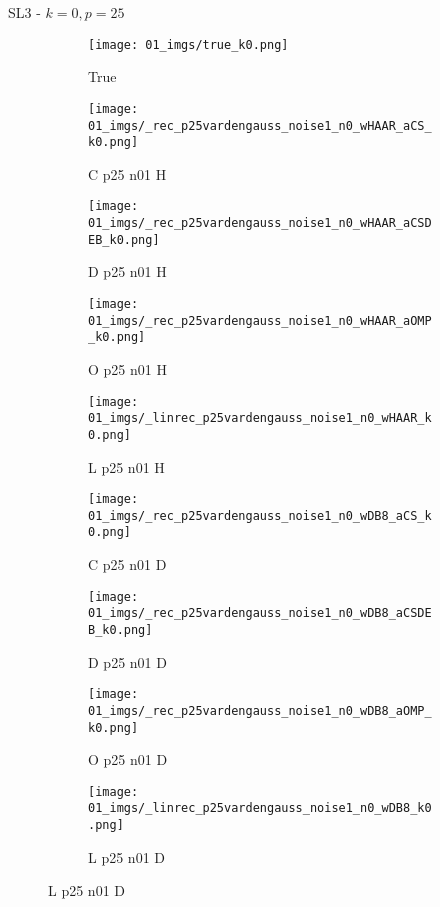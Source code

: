 \begin{frame}{SL3 - $k=0,p=25$}{}
\begin{figure}
\begin{subfigure}{0.1\textwidth}
\texttt{[image: 01\_imgs/true\_k0.png]}
\caption*{\Tiny True}
\end{subfigure}
\begin{subfigure}{0.1\textwidth}
\texttt{[image: 01\_imgs/\_rec\_p25vardengauss\_noise1\_n0\_wHAAR\_aCS\_k0.png]}
\caption*{\Tiny C p25 n01 H}
\end{subfigure}
\begin{subfigure}{0.1\textwidth}
\texttt{[image: 01\_imgs/\_rec\_p25vardengauss\_noise1\_n0\_wHAAR\_aCSDEB\_k0.png]}
\caption*{\Tiny D p25 n01 H}
\end{subfigure}
\begin{subfigure}{0.1\textwidth}
\texttt{[image: 01\_imgs/\_rec\_p25vardengauss\_noise1\_n0\_wHAAR\_aOMP\_k0.png]}
\caption*{\Tiny O p25 n01 H}
\end{subfigure}
\begin{subfigure}{0.1\textwidth}
\texttt{[image: 01\_imgs/\_linrec\_p25vardengauss\_noise1\_n0\_wHAAR\_k0.png]}
\caption*{\Tiny L p25 n01 H}
\end{subfigure}
\begin{subfigure}{0.1\textwidth}
\texttt{[image: 01\_imgs/\_rec\_p25vardengauss\_noise1\_n0\_wDB8\_aCS\_k0.png]}
\caption*{\Tiny C p25 n01 D}
\end{subfigure}
\begin{subfigure}{0.1\textwidth}
\texttt{[image: 01\_imgs/\_rec\_p25vardengauss\_noise1\_n0\_wDB8\_aCSDEB\_k0.png]}
\caption*{\Tiny D p25 n01 D}
\end{subfigure}
\begin{subfigure}{0.1\textwidth}
\texttt{[image: 01\_imgs/\_rec\_p25vardengauss\_noise1\_n0\_wDB8\_aOMP\_k0.png]}
\caption*{\Tiny O p25 n01 D}
\end{subfigure}
\begin{subfigure}{0.1\textwidth}
\texttt{[image: 01\_imgs/\_linrec\_p25vardengauss\_noise1\_n0\_wDB8\_k0.png]}
\caption*{\Tiny L p25 n01 D}
\end{subfigure}


\vspace{5pt}


\end{figure}
\end{frame}
